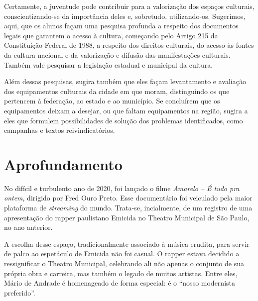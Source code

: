 \documentclass[11pt]{extarticle}
\begin{document}
Certamente, a juventude pode contribuir para a valorização dos espaços
culturais, conscientizando-se da importância deles e, sobretudo,
utilizando-os. Sugerimos, aqui, que os alunos façam uma pesquisa
profunda a respeito dos documentos legais que garantem o acesso à
cultura, começando pelo Artigo 215 da Constituição Federal de 1988, a
respeito dos direitos culturais, do acesso às fontes da cultura nacional
e da valorização e difusão das manifestações culturais. Também vale
pesquisar a legislação estadual e municipal da cultura.

Além dessas pesquisas, sugira também que eles façam levantamento e
avaliação dos equipamentos culturais da cidade em que moram,
distinguindo os que pertencem à federação, ao estado e ao município. Se
concluírem que os equipamentos deixam a desejar, ou que faltam
equipamentos na região, sugira a eles que formulem possibilidades de
solução dos problemas identificados, como campanhas e textos
reivindicatórios.

\section{Aprofundamento}


No difícil e turbulento ano de 2020, foi lançado o filme \emph{Amarelo
-- É tudo pra ontem}, dirigido por Fred Ouro Preto. Esse documentário
foi veiculado pela maior plataforma de \emph{streaming} do mundo.
Trata-se, incialmente, de um registro de uma apresentação do rapper
paulistano Emicida no Theatro Municipal de São Paulo, no ano anterior.

A escolha desse espaço, tradicionalmente associado à música erudita,
para servir de palco ao espetáculo de Emicida não foi casual. O rapper
estava decidido a ressignificar o Theatro Municipal, celebrando ali não
apenas o conjunto de sua própria obra e carreira, mas também o legado de
muitos artistas. Entre eles, Mário de Andrade é homenageado de forma
especial: é o ``nosso modernista preferido''.
\end{document}
